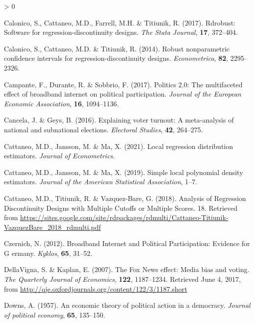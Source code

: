 \documentclass[
  12pt,
]{article}
\newlength{\cslhangindent}
\newenvironment{CSLReferences}[2] %
 {%
  \setlength{\parindent}{0pt}
  \ifodd #1 \everypar{\setlength{\hangindent}{\cslhangindent}}\ignorespaces\fi
  \ifnum #2 > 0
  \setlength{\parskip}{#2\baselineskip}
  \fi
 }%
 {}
\begin{document}
\begin{CSLReferences}{1}{0}
\leavevmode\hypertarget{ref-calonico_rdrobust_2017}{}%
Calonico, S., Cattaneo, M.D., Farrell, M.H. \& Titiunik, R. (2017).
Rdrobust: {Software} for regression-discontinuity designs. \emph{The
Stata Journal}, \textbf{17}, 372--404.

\leavevmode\hypertarget{ref-calonico_robust_2014}{}%
Calonico, S., Cattaneo, M.D. \& Titiunik, R. (2014). Robust
nonparametric confidence intervals for regression-discontinuity designs.
\emph{Econometrica}, \textbf{82}, 2295--2326.

\leavevmode\hypertarget{ref-campante_politics_2017}{}%
Campante, F., Durante, R. \& Sobbrio, F. (2017). Politics 2.0: {The}
multifaceted effect of broadband internet on political participation.
\emph{Journal of the European Economic Association}, \textbf{16},
1094--1136.

\leavevmode\hypertarget{ref-cancela_explaining_2016}{}%
Cancela, J. \& Geys, B. (2016). Explaining voter turnout: {A}
meta-analysis of national and subnational elections. \emph{Electoral
Studies}, \textbf{42}, 264--275.

\leavevmode\hypertarget{ref-cattaneo_local_2021}{}%
Cattaneo, M.D., Jansson, M. \& Ma, X. (2021). Local regression
distribution estimators. \emph{Journal of Econometrics}.

\leavevmode\hypertarget{ref-cattaneo_simple_2019}{}%
Cattaneo, M.D., Jansson, M. \& Ma, X. (2019). Simple local polynomial
density estimators. \emph{Journal of the American Statistical
Association}, 1--7.

\leavevmode\hypertarget{ref-cattaneo_analysis_2018}{}%
Cattaneo, M.D., Titiunik, R. \& Vazquez-Bare, G. (2018). Analysis of
{Regression} {Discontinuity} {Designs} with {Multiple} {Cutoffs} or
{Multiple} {Scores}. 18. Retrieved from
\url{https://sites.google.com/site/rdpackages/rdmulti/Cattaneo-Titiunik-VazquezBare_2018_rdmulti.pdf}

\leavevmode\hypertarget{ref-czernich_broadband_2012}{}%
Czernich, N. (2012). Broadband {Internet} and {Political}
{Participation}: {Evidence} for {G} ermany. \emph{Kyklos}, \textbf{65},
31--52.

\leavevmode\hypertarget{ref-dellavigna_fox_2007}{}%
DellaVigna, S. \& Kaplan, E. (2007). The {Fox} {News} effect: {Media}
bias and voting. \emph{The Quarterly Journal of Economics},
\textbf{122}, 1187--1234. Retrieved June 4, 2017, from
\url{http://qje.oxfordjournals.org/content/122/3/1187.short}

\leavevmode\hypertarget{ref-downs_economic_1957}{}%
Downs, A. (1957). An economic theory of political action in a democracy.
\emph{Journal of political economy}, \textbf{65}, 135--150.


\end{CSLReferences}
\end{document}
